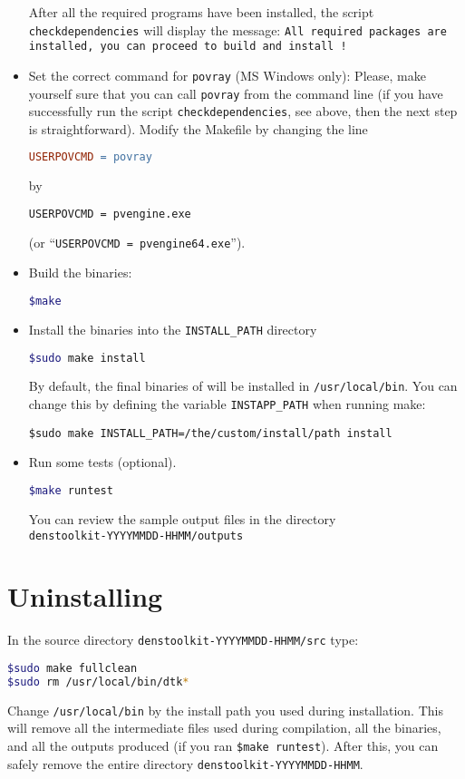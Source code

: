 \begin{itemize}
After all the required programs have been installed, the script \texttt{checkdependencies} will display the message: \texttt{All required packages are installed, you can proceed to build and install \DTK!}
\item Set the correct command for \texttt{povray} (MS Windows only): Please, make yourself sure that you can call \texttt{povray} from the command line (if you have successfully run the script \texttt{checkdependencies}, see above, then the next step is straightforward). Modify the Makefile by changing the line
\begin{lstlisting}[language=make]
USERPOVCMD = povray
\end{lstlisting}
by
\begin{lstlisting}[language=bash]
USERPOVCMD = pvengine.exe
\end{lstlisting}
(or ``\texttt{USERPOVCMD = pvengine64.exe}'').
\item Build the \DTK{} binaries:
\begin{lstlisting}[language=bash]
$make
\end{lstlisting}
\item Install the binaries into the \texttt{INSTALL\_PATH} directory
  \begin{lstlisting}[language=bash]
$sudo make install
\end{lstlisting}
   By default, the final binaries of \DTK{} will be installed in \texttt{/usr/local/bin}.
   You can change this by defining the variable \texttt{INSTAPP\_PATH} when running make:
\begin{lstlisting}
$sudo make INSTALL_PATH=/the/custom/install/path install
\end{lstlisting}
\item Run some tests (optional).
\begin{lstlisting}[language=bash]
$make runtest
\end{lstlisting}
 You can review the sample output files in the directory\\
\texttt{denstoolkit-YYYYMMDD-HHMM/outputs}
\end{itemize}

\section{Uninstalling \DTK}

In the source directory \texttt{denstoolkit-YYYYMMDD-HHMM/src} type:
\begin{lstlisting}[language=bash]
$sudo make fullclean
$sudo rm /usr/local/bin/dtk*
\end{lstlisting}
Change \texttt{/usr/local/bin} by the install path you used during installation.
This will remove all the intermediate files used during compilation, all the binaries, and all the outputs produced (if you ran \texttt{\$make runtest}). After this, you can safely remove the entire directory \texttt{denstoolkit-YYYYMMDD-HHMM}.








